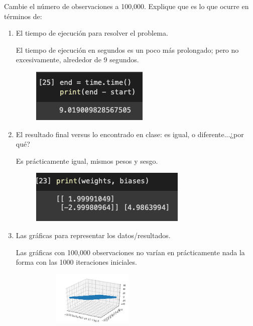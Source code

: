 \begin{problema}
	Cambie el número de observaciones a 100,000.  Explique que es lo que ocurre en términos de:
	\begin{enumerate}
		\item El tiempo de ejecución para resolver el problema.
		\begin{sol}
			El tiempo de ejecución en segundos es un poco más prolongado; pero no excesivamente, alrededor de 9 segundos.			\begin{figure}[H]
				\centering
				\includegraphics[scale=0.5]{Images/1.3}
			\end{figure}
		\end{sol}
		\item El resultado final versus lo encontrado en clase:  es igual, o diferente...¿por qué?
		\begin{sol}
				Es prácticamente igual, mismos pesos y sesgo. 
			\begin{figure}[H]
				\centering
				\includegraphics[scale=0.5]{Images/1.4}
			\end{figure}
		\end{sol}
		\item Las gráficas  para representar los datos/resultados.
		\begin{sol}
			Las gráficas con 100,000 observaciones no varían en prácticamente nada la forma con las 1000 iteraciones iniciales. 
			\begin{figure}[H]
				\centering
				\begin{subfigure}{.5\textwidth}
					\centering
					\includegraphics[width=0.45\textwidth]{Images/1.1}

\end{subfigure}
\end{figure}
\end{sol}
\end{enumerate}
\end{problema}
